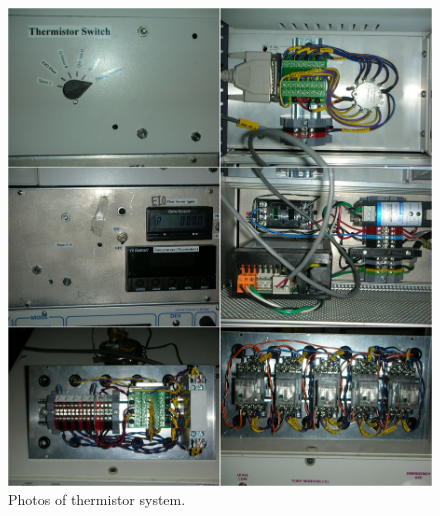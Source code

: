 \begin{figure}[!htbp]
 \centering
 \includegraphics[width=\textwidth]{./img/subsystem-thermistor-photos.png}
 \caption{Photos of thermistor system.}
 \label{fig:subsystem-thermistor-photos}
\end{figure}